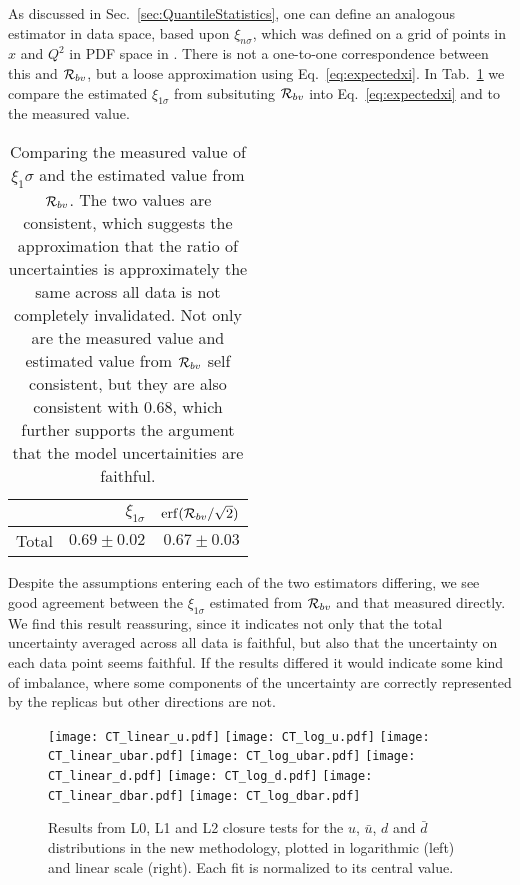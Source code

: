 As discussed in Sec.~\ref{sec:QuantileStatistics}, one can define an analogous
estimator in data space, based upon $\xi_{n\sigma}$, which was defined on a grid
of points in $x$ and $Q^2$ in PDF space in \cite{nnpdf30}. There is not
a one-to-one correspondence
between this and $\mathcal{R}_{bv}$, but a loose approximation using
Eq.~\ref{eq:expectedxi}. In Tab.~\ref{tab:xicomparison} we compare the estimated
$\xi_{1\sigma}$ from
subsituting $\mathcal{R}_{bv}$ into Eq.~\ref{eq:expectedxi} and to the
measured value.
\begin{table}[h]
    \begin{center}
        \begin{tabular}{lrr}
            \toprule
            {}     & $\xi_{1\sigma}$ & ${\rm erf}(\mathcal{R}_{bv}/\sqrt{2})$ \\
            \midrule
            Total  & $0.69\pm0.02$   & $0.67\pm0.03$                  \\
            \bottomrule
            \end{tabular}
    \end{center}
    \caption{
        Comparing the measured value of $\xi_1\sigma$ and the estimated
        value from $\mathcal{R}_{bv}$. The two values are consistent, which
        suggests the approximation that the ratio of uncertainties is
        approximately the same across all data is not completely invalidated.
        Not only are the measured value and estimated value from $\mathcal{R}_{bv}$
        self consistent, but they are also consistent with $0.68$, which
        further supports the argument that the model uncertainities are
        faithful.
    }
    \label{tab:xicomparison}
\end{table}
Despite the assumptions entering each of the two estimators differing, we see
good agreement between the $\xi_{1\sigma}$ estimated from $\mathcal{R}_{bv}$
and that measured directly. We find this result reassuring, since it indicates
not only that the total uncertainty averaged across all data is faithful, but
also that the uncertainty on each data point seems faithful. If the results
differed it would indicate some kind of imbalance, where some components
of the uncertainty are correctly represented by the replicas but other directions
are not.

\iffalse
\begin{figure}[ht]
    \centering
    \texttt{[image: CT\_linear\_u.pdf]}
    \texttt{[image: CT\_log\_u.pdf]}
    \texttt{[image: CT\_linear\_ubar.pdf]}
    \texttt{[image: CT\_log\_ubar.pdf]}
    \texttt{[image: CT\_linear\_d.pdf]}
    \texttt{[image: CT\_log\_d.pdf]}
    \texttt{[image: CT\_linear\_dbar.pdf]}
    \texttt{[image: CT\_log\_dbar.pdf]}
    \caption{Results from L0, L1 and L2 closure tests for the $u$, $\bar{u}$, $d$ and $\bar{d}$ distributions in the new methodology,
    plotted in logarithmic (left) and linear scale (right). Each fit is normalized to its central value.}
    \label{fig:nnpdf40_ct_errors1}    
\end{figure}


